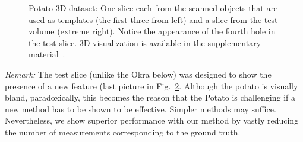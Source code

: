 \documentclass[journal]{IEEEtran}
\begin{document}
\begin{figure}[!h]
\begin{subfigure}[b]{0.24\linewidth}
\captionsetup{labelformat=empty}
        \caption{}
     \end{subfigure}
    \begin{subfigure}[b]{0.235\linewidth}
\captionsetup{labelformat=empty}
\caption{}
\label{fig:potato3D_test}
     \end{subfigure}
      \caption{Potato 3D dataset: One slice each from the scanned
        objects that are used as templates (the first three from
        left) and a slice from the test volume (extreme right). Notice
        the appearance of the fourth hole in the test slice. 3D visualization is available
      in the supplementary material~\cite{supp_paper}.}
\label{fig:potato_dataset}
\end{figure}

\textit{Remark:} The test slice (unlike the Okra below) was designed
to show the presence of a new feature (last picture in
Fig.~\ref{fig:potato_dataset}. Although the potato is visually bland,
paradoxically, this becomes the reason that the Potato is challenging
if a new method has to be shown to be effective.  Simpler methods may
suffice.  Nevertheless, we show superior performance with our method by
vastly reducing the number of measurements corresponding to the ground truth.
\end{document}
